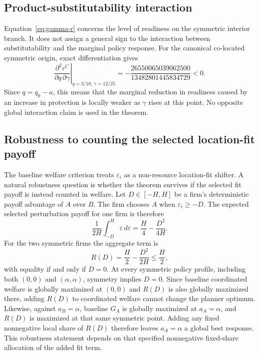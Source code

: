 \subsection{Product-substitutability interaction}

Equation~\eqref{eq:gamma-r} concerns the level of readiness on the symmetric interior branch. It does not assign a general sign to the interaction between substitutability and the marginal policy response. For the canonical co-located symmetric origin, exact differentiation gives
\begin{equation}
\left.\frac{\partial^2r^C}{\partial q\,\partial\gamma}\right|_{q=3/10,\,\gamma=12/25}
=-\frac{26550065039062500}{13482801445834729}<0.
\end{equation}
Since $q=q_0-a$, this means that the marginal reduction in readiness caused by an increase in protection is locally weaker as $\gamma$ rises at this point. No opposite global interaction claim is used in the theorem.

\subsection{Robustness to counting the selected location-fit payoff}\label{app:fit-robustness}

The baseline welfare criterion treats $\varepsilon_i$ as a non-resource location-fit shifter. A natural robustness question is whether the theorem survives if the selected fit payoff is instead counted in welfare. Let $D\in[-H,H]$ be a firm's deterministic payoff advantage of $A$ over $B$. The firm chooses $A$ when $\varepsilon_i\ge -D$. The expected selected perturbation payoff for one firm is therefore
\begin{equation}
\frac{1}{2H}\int_{-D}^{H}\varepsilon\,d\varepsilon
=\frac H4-\frac{D^2}{4H}.
\end{equation}
For the two symmetric firms the aggregate term is
\begin{equation}
R(D)=\frac H2-\frac{D^2}{2H}\leq \frac H2,
\label{eq:fit-payoff}
\end{equation}
with equality if and only if $D=0$. At every symmetric policy profile, including both $(0,0)$ and $(\alpha,\alpha)$, symmetry implies $D=0$. Since baseline coordinated welfare is globally maximized at $(0,0)$ and $R(D)$ is also globally maximized there, adding $R(D)$ to coordinated welfare cannot change the planner optimum. Likewise, against $a_B=\alpha$, baseline $G_A$ is globally maximized at $a_A=\alpha$, and $R(D)$ is maximized at that same symmetric point. Adding any fixed nonnegative local share of $R(D)$ therefore leaves $a_A=\alpha$ a global best response. This robustness statement depends on that specified nonnegative fixed-share allocation of the added fit term.

